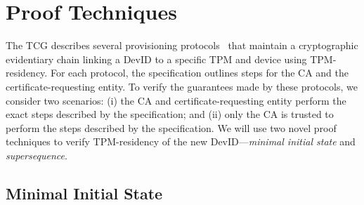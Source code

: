 \documentclass[runningheads]{llncs}
\begin{document}
  

%
%
%
\section{Proof Techniques}

The TCG describes several provisioning protocols~\citep{DevIDSpec-TCG}
that maintain a cryptographic evidentiary chain linking a
DevID to a specific TPM and device using TPM-residency. For each
protocol, the specification outlines steps for the CA and the
certificate-requesting entity.  To verify the guarantees made
by these protocols, we consider two scenarios: (i) the CA and 
certificate-requesting entity
perform the exact steps described by the specification; and (ii) only the 
CA is trusted to perform the steps described by the specification.
We will use two novel proof techniques
to verify TPM-residency of the new DevID---\emph{minimal initial state} and
\emph{supersequence}.

\subsection{Minimal Initial State}
\end{document}
